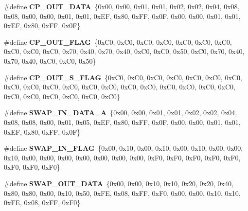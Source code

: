 \begin{DoxyCompactItemize}
\item 
\mbox{\label{unit-test-cpu-dispatch_8c_a9c53bd7d9f12654918c3cbed39eb6bd5}} 
\#define {\bfseries C\+P\+\_\+\+O\+U\+T\+\_\+\+D\+A\+TA}~\{0x00, 0x00, 0x01, 0x01, 0x02, 0x02, 0x04, 0x08, 0x08, 0x00, 0x00, 0x01, 0x01, 0x\+E\+F, 0x80, 0x\+F\+F, 0x0\+F, 0x00, 0x00, 0x01, 0x01, 0x\+E\+F, 0x80, 0x\+F\+F, 0x0\+F\}
\item 
\mbox{\label{unit-test-cpu-dispatch_8c_aa9cb272f7d2ad33391ce888443926594}} 
\#define {\bfseries C\+P\+\_\+\+O\+U\+T\+\_\+\+F\+L\+AG}~\{0x\+C0, 0x\+C0, 0x\+C0, 0x\+C0, 0x\+C0, 0x\+C0, 0x\+C0, 0x\+C0, 0x\+C0, 0x\+C0, 0x70, 0x40, 0x70, 0x40, 0x\+C0, 0x\+C0, 0x50, 0x\+C0, 0x70, 0x40, 0x70, 0x40, 0x\+C0, 0x\+C0, 0x50\}
\item 
\mbox{\label{unit-test-cpu-dispatch_8c_ae11cbe253cab0c37e67f62a8866eadf2}} 
\#define {\bfseries C\+P\+\_\+\+O\+U\+T\+\_\+\+S\+\_\+\+F\+L\+AG}~\{0x\+C0, 0x\+C0, 0x\+C0, 0x\+C0, 0x\+C0, 0x\+C0, 0x\+C0, 0x\+C0, 0x\+C0, 0x\+C0, 0x\+C0, 0x\+C0, 0x\+C0, 0x\+C0, 0x\+C0, 0x\+C0, 0x\+C0, 0x\+C0, 0x\+C0, 0x\+C0, 0x\+C0, 0x\+C0, 0x\+C0, 0x\+C0, 0x\+C0\}
\item 
\mbox{\label{unit-test-cpu-dispatch_8c_ae49d8cb65d721901dffb000f0bcd6d5e}} 
\#define {\bfseries S\+W\+A\+P\+\_\+\+I\+N\+\_\+\+D\+A\+T\+A\+\_\+A}~\{0x00, 0x00, 0x01, 0x01, 0x02, 0x02, 0x04, 0x08, 0x08, 0x00, 0x01, 0x05, 0x\+E\+F, 0x80, 0x\+F\+F, 0x0\+F, 0x00, 0x00, 0x01, 0x01, 0x\+E\+F, 0x80, 0x\+F\+F, 0x0\+F\}
\item 
\mbox{\label{unit-test-cpu-dispatch_8c_a8a765ae9c8a34f9b12984153335b1e12}} 
\#define {\bfseries S\+W\+A\+P\+\_\+\+I\+N\+\_\+\+F\+L\+AG}~\{0x00, 0x10, 0x00, 0x10, 0x00, 0x10, 0x00, 0x00, 0x10, 0x00, 0x00, 0x00, 0x00, 0x00, 0x00, 0x00, 0x\+F0, 0x\+F0, 0x\+F0, 0x\+F0, 0x\+F0, 0x\+F0, 0x\+F0, 0x\+F0\}
\item 
\mbox{\label{unit-test-cpu-dispatch_8c_abc4e797a5d65e81013fc52a9476e874f}} 
\#define {\bfseries S\+W\+A\+P\+\_\+\+O\+U\+T\+\_\+\+D\+A\+TA}~\{0x00, 0x00, 0x10, 0x10, 0x20, 0x20, 0x40, 0x80, 0x80, 0x00, 0x10, 0x50, 0x\+F\+E, 0x08, 0x\+F\+F, 0x\+F0, 0x00, 0x00, 0x10, 0x10, 0x\+F\+E, 0x08, 0x\+F\+F, 0x\+F0\}

\end{DoxyCompactItemize}
